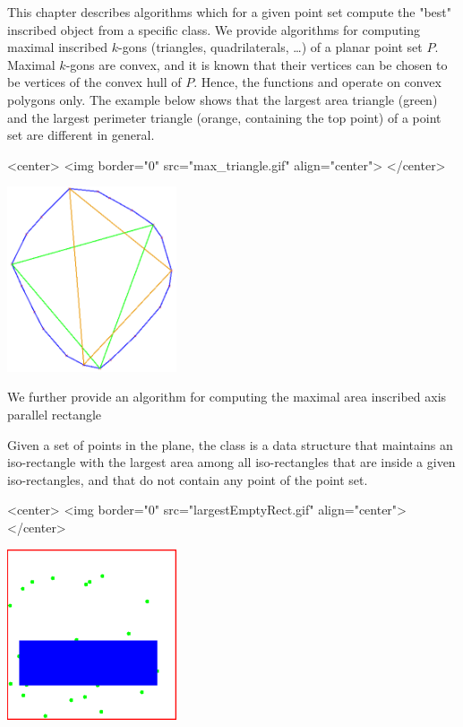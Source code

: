
This chapter describes algorithms which for a given point set compute
the "best" inscribed object from a specific
class. We provide algorithms for
computing maximal inscribed $k$-gons (triangles, quadrilaterals,
\dots) of a planar point set $P$. Maximal $k$-gons are convex, and it
is known that their vertices can be chosen to be vertices of the
convex hull of $P$. Hence, the functions
 and
 operate on convex polygons
only. The example below shows that the largest area triangle (green)
and the largest perimeter triangle (orange, containing the top point)
of a point set are different in general.

\begin{ccHtmlOnly}
<center>
<img border="0" src="max_triangle.gif" align="center">
</center>
\end{ccHtmlOnly} 

\begin{ccTexOnly}
\begin{center}
\includegraphics[width=5cm]{Inscribed_areas/max_triangle}
\end{center}
\end{ccTexOnly}


We further provide an algorithm for computing the maximal area
inscribed axis parallel rectangle 

Given a set of points in the plane, the class 
is a data structure that maintains an iso-rectangle with the largest area among
all iso-rectangles that are inside a given iso-rectangles, and
that do not contain any point of the point set.

\begin{ccHtmlOnly}
<center>
<img border="0" src="largestEmptyRect.gif" align="center">
</center>
\end{ccHtmlOnly} 

\begin{ccTexOnly}
\begin{center}
\includegraphics[width=5cm]{Inscribed_areas/largestEmptyRect}
\end{center}
\end{ccTexOnly}

